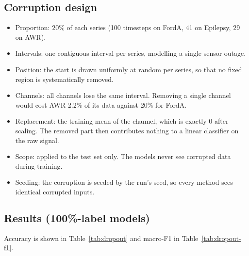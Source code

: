 \documentclass[a4paper,11pt]{article}
\begin{document}
\subsection{Corruption design}
\begin{itemize}
    \item Proportion: 20\% of each series (100 timesteps on FordA, 41 on Epilepsy, 29 on AWR).
    \item Intervals: one contiguous interval per series, modelling a single sensor outage.
    \item Position: the start is drawn uniformly at random per series, so that no fixed region is systematically removed.
    \item Channels: all channels lose the same interval. Removing a single channel would cost AWR 2.2\% of its data against 20\% for FordA.
    \item Replacement: the training mean of the channel, which is exactly 0 after scaling. The removed part then contributes nothing to a linear classifier on the raw signal.
    \item Scope: applied to the test set only. The models never see corrupted data during training.
    \item Seeding: the corruption is seeded by the run's seed, so every method sees identical corrupted inputs.
\end{itemize}

\subsection{Results (100\%-label models)}
Accuracy is shown in Table~\ref{tab:dropout} and macro-F1 in Table~\ref{tab:dropout-f1}.
\end{document}
